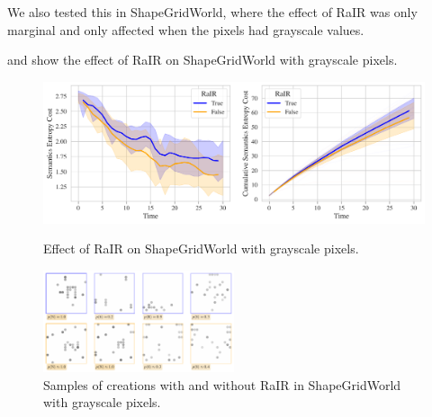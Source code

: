 We also tested this in ShapeGridWorld, where the effect of RaIR was only marginal and only affected when the pixels had grayscale values.

 and  show the effect of RaIR on ShapeGridWorld with grayscale pixels.

\begin{figure}[h]
    \centering
    \includegraphics[width=\textwidth]{images/rair_comparison_sgw_color.pdf}
    \caption{Effect of RaIR on ShapeGridWorld with grayscale pixels.}
    \label{fig:rair-color-sgw}
    \vspace{12pt}
    \includegraphics[width=0.5\textwidth]{images/rair_samples_sgw_color.pdf}
    \caption{Samples of creations with and without RaIR in ShapeGridWorld with grayscale pixels.}
    \label{fig:rair-samples-color-sgw}
\end{figure}

